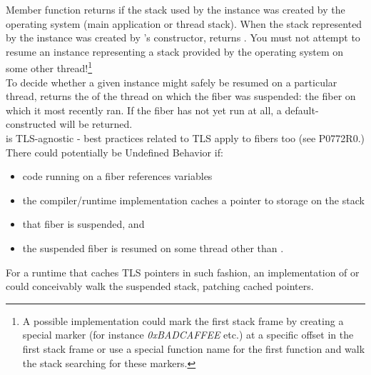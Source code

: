 
Member function \usessysstack returns  if the stack used by the
\fiber instance was created by the operating system (main application or thread
stack). When the stack represented by the \fiber instance was created
by \fiber's constructor, \usessysstack returns . You must not
attempt to resume an instance representing a stack
provided by the operating system on some other thread!\footnote{A possible
implementation could mark the first stack frame by creating
a special marker (for instance \emph{0xBADCAFFEE} etc.) at a specific offset
in the first stack frame or use a special function name for the first function 
and walk the stack searching for these markers.}\\

To decide whether a given \fiber instance might safely be resumed on a
particular thread, \prevtid returns the  of the thread on
which the fiber was suspended: the fiber on which it most recently ran. If the
fiber has not yet run at all, a default-constructed  will
be returned.\\

\fiber is TLS-agnostic - best practices related to TLS apply to fibers too
(see P0772R0.)\\

There could potentially be Undefined Behavior if:
\begin{itemize}
    \item code running on a fiber references  variables
    \item the compiler/runtime implementation caches a pointer
          to  storage on the stack
    \item that fiber is suspended, and
    \item the suspended fiber is resumed on some thread other than \prevtid.
\end{itemize}

For a runtime that caches TLS pointers in such fashion, an implementation
of \xtresume or\\
\xtresumewith could conceivably walk the suspended stack,
patching cached pointers.
